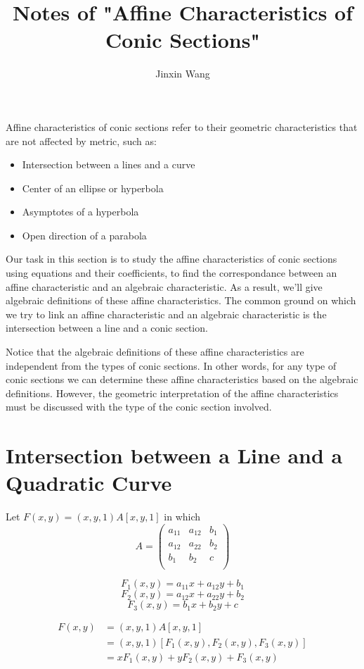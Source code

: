 \documentclass[onecolumn]{ctexart}
\title{Notes of "Affine Characteristics of Conic Sections"}
\author{Jinxin Wang}
\date{}
\begin{document}
\maketitle

Affine characteristics of conic sections refer to their geometric 
characteristics that are not affected by metric, such as:
\begin{itemize}
  \item Intersection between a lines and a curve
  \item Center of an ellipse or hyperbola
  \item Asymptotes of a hyperbola
  \item Open direction of a parabola
\end{itemize}

Our task in this section is to study the affine characteristics of conic 
sections using equations and their coefficients, to find the correspondance 
between an affine characteristic and an algebraic characteristic. As a result, 
we'll give algebraic definitions of these affine characteristics. The common 
ground on which we try to link an affine characteristic and an algebraic 
characteristic is the intersection between a line and a conic section.

Notice that the algebraic definitions of these affine characteristics are 
independent from the types of conic sections. In other words, for any type of 
conic sections we can determine these affine characteristics based on the 
algebraic definitions. However, the geometric interpretation of the affine 
characteristics must be discussed with the type of the conic section involved.

\section{Intersection between a Line and a Quadratic Curve}

Let $F(x, y) = (x, y, 1)A[x, y, 1]$ in which
\[
  A = 
  \begin{pmatrix}
    a_{11} & a_{12} & b_1 \\
    a_{12} & a_{22} & b_2 \\
    b_1 & b_2 & c \\
  \end{pmatrix}
\]

\[
  F_1(x, y) = a_{11}x + a_{12}y + b_1
\]
\[
  F_2(x, y) = a_{12}x + a_{22}y + b_2
\]
\[
  F_3(x, y) = b_1 x + b_2 y + c
\]

\[
  \begin{split}
    F(x, y) &= (x, y, 1)A[x, y, 1] \\
            &= (x, y, 1)[F_1(x, y), F_2(x, y), F_3(x, y)] \\
            &= xF_1(x, y) + yF_2(x, y) + F_3(x, y)
  \end{split}
\]
\end{document}
